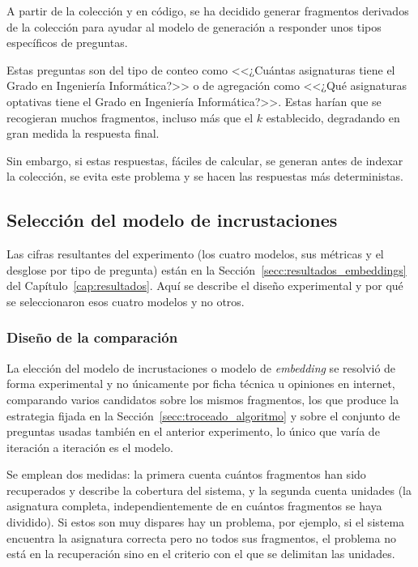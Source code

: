 A partir de la colección y en código, se ha decidido generar fragmentos derivados de la colección para ayudar al modelo de generación a responder unos tipos específicos de preguntas.

Estas preguntas son del tipo de conteo como <<¿Cuántas asignaturas tiene el Grado en Ingeniería Informática?>> o de agregación como <<¿Qué asignaturas optativas tiene el Grado en Ingeniería Informática?>>. Estas harían que se recogieran muchos fragmentos, incluso más que el $k$ establecido, degradando en gran medida la respuesta final.

Sin embargo, si estas respuestas, fáciles de calcular, se generan antes de indexar la colección, se evita este problema y se hacen las respuestas más deterministas.

\subsection[Selección del modelo de incrustaciones]{Selección del modelo de incrustaciones}
\label{secc:fase1_embeddings}

Las cifras resultantes del experimento (los cuatro modelos, sus métricas y el desglose por tipo de pregunta) están en la Sección~\ref{secc:resultados_embeddings} del 
  Capítulo~\ref{cap:resultados}. Aquí se describe el diseño experimental y por qué se seleccionaron esos cuatro modelos y no otros.

\subsubsection{Diseño de la comparación}

La elección del modelo de incrustaciones o modelo de \textit{embedding} se resolvió de forma experimental y no únicamente por ficha técnica u opiniones en internet, comparando varios candidatos sobre los mismos fragmentos, los que produce la estrategia fijada en la Sección~\ref{secc:troceado_algoritmo} y sobre el conjunto de preguntas usadas también en el anterior experimento, lo único que varía de iteración a iteración es el modelo.

Se emplean dos medidas: la primera cuenta cuántos fragmentos han sido recuperados y describe la cobertura del sistema, y la segunda cuenta unidades (la asignatura completa, independientemente de en cuántos fragmentos se haya dividido). Si estos son muy dispares hay un problema, por ejemplo, si el sistema encuentra la asignatura correcta pero no todos sus fragmentos, el problema no está en la recuperación sino en el criterio con el que se delimitan las unidades.

